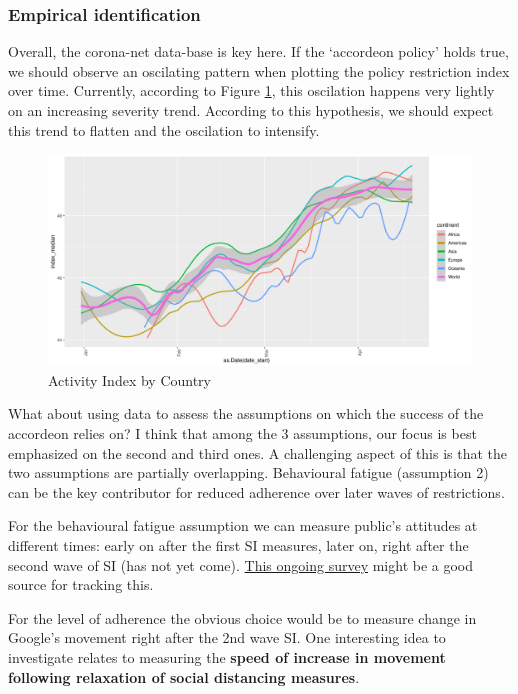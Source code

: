 \documentclass[
  english,
  ,doc,floatsintext]{apa6}
\begin{document}
\hypertarget{empirical-identification}{%
\subsubsection{Empirical identification}\label{empirical-identification}}

Overall, the corona-net data-base is key here.
If the `accordeon policy' holds true, we should observe an oscilating pattern when plotting the policy restriction index over time.
Currently, according to Figure \ref{fig:ActIndex}, this oscilation happens very lightly on an increasing severity trend.
According to this hypothesis, we should expect this trend to flatten and the oscilation to intensify.

\begin{figure}
\centering
\includegraphics{covid-19_2_files/figure-latex/ActIndex-1.pdf}
\caption{\label{fig:ActIndex}Activity Index by Country}
\end{figure}

What about using data to assess the assumptions on which the success of the accordeon relies on?
I think that among the 3 assumptions, our focus is best emphasized on the second and third ones.
A challenging aspect of this is that the two assumptions are partially overlapping.
Behavioural fatigue (assumption 2) can be the key contributor for reduced adherence over later waves of restrictions.

For the behavioural fatigue assumption we can measure public's attitudes at different times: early on after the first SI measures, later on, right after the second wave of SI (has not yet come). \href{https://www.nber.org/papers/w27082}{This ongoing survey} might be a good source for tracking this.

For the level of adherence the obvious choice would be to measure change in Google's movement right after the 2nd wave SI.
One interesting idea to investigate relates to measuring the \textbf{speed of increase in movement following relaxation of social distancing measures}.
\end{document}

